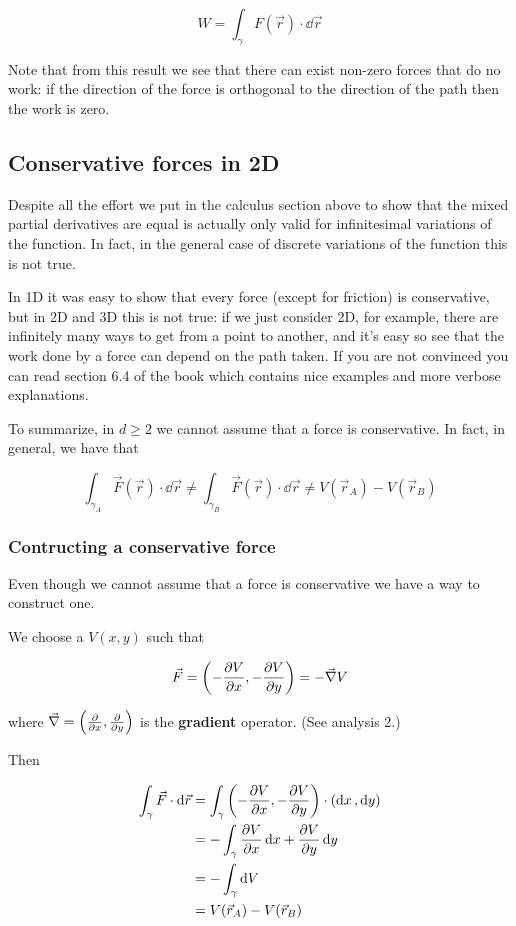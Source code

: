 \documentclass[10pt]{extarticle}
\begin{document}
$$
    W = \int_{\gamma} F(\vec{r}) \cdot \dd{\vec{r}}
$$

Note that from this result we see that there can exist non-zero forces that do no work:
if the direction of the force is orthogonal to the direction of the path then the work is zero.

\subsection{Conservative forces in 2D}

Despite all the effort we put in the calculus section above to show that the mixed partial derivatives are equal is actually only valid for infinitesimal variations of the function.
In fact, in the general case of discrete variations of the function this is not true.

In 1D it was easy to show that every force (except for friction) is conservative, but in 2D and 3D this is not true:
if we just consider 2D, for example, there are infinitely many ways to get from a point to another, and it's easy so see that the work done by a force can depend on the path taken.
If you are not convinced you can read section 6.4 of the book which contains nice examples and more verbose explanations.

To summarize, in $d \geq 2$ we cannot assume that a force is conservative. In fact, in general, we have that

$$
    \int_{\gamma_A} \vec{F}(\vec{r}) \cdot \dd \vec{r} \neq \int_{\gamma_B} \vec{F}(\vec{r}) \cdot \dd \vec{r} \ne V(\vec{r}_A) - V(\vec{r}_B)
$$

\subsubsection{Contructing a conservative force}

Even though we cannot assume that a force is conservative we have a way to construct one.

We choose a $V(x, y)$ such that

$$
    \vec{F} = \left( - \pdv{V}{x}, - \pdv{V}{y} \right) = -\vec{\nabla} V
$$

where $\vec{\nabla} = \left( \pdv{x}, \pdv{y} \right)$ is the \textbf{gradient} operator. (See analysis 2.)

Then

\begin{align*}
    \int_\gamma \vec{F} \cdot \dd{\vec{r}} & = \int_\gamma \left( -\pdv{V}{x}, -\pdv{V}{y} \right) \cdot (\dd{x}, \dd{y}) \\
                                           & = - \int_\gamma \pdv{V}{x} \dd{x} + \pdv{V}{y} \dd{y}                        \\
                                           & = - \int_\gamma \dd{V}                                                       \\
                                           & = V(\vec{r}_A) - V(\vec{r}_B)
\end{align*}
\end{document}
